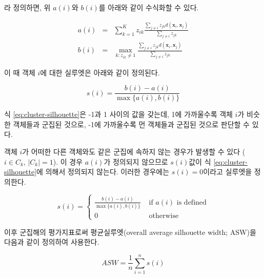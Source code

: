 \documentclass[
]{book}
\begin{document}
라 정의하면, 위 \(a(i)\)와 \(b(i)\)를 아래와 같이 수식화할 수 있다.

\begin{eqnarray*}
a(i) &=& \sum_{k = 1}^{K} z_{ik} \frac{\sum_{j \neq i} z_{jk} d(\mathbf{x}_i, \mathbf{x}_j)}{\sum_{j \neq i} z_{jk}}\\
b(i) &=& \max_{k: z_{ik} \neq 1} \frac{\sum_{j \neq i} z_{jk} d(\mathbf{x}_i, \mathbf{x}_j)}{\sum_{j \neq i} z_{jk}}
\end{eqnarray*}

이 때 객체 \(i\)에 대한 실루엣은 아래와 같이 정의된다.

\begin{equation}
s(i) = \frac{b(i) - a(i)}{\max \{ a(i), b(i) \}} \label{eq:cluster-silhouette}
\end{equation}

식 \eqref{eq:cluster-silhouette}은 -1과 1 사이의 값을 갖는데, 1에 가까울수록 객체 \(i\)가 비슷한 객체들과 군집된 것으로, -1에 가까울수록 먼 객체들과 군집된 것으로 판단할 수 있다.

객체 \(i\)가 어떠한 다른 객체와도 같은 군집에 속하지 않는 경우가 발생할 수 있다 (\(i \in C_k, \, \left| C_k \right| = 1\)). 이 경우 \(a(i)\)가 정의되지 않으므로 \(s(i)\)값이 식 \eqref{eq:cluster-silhouette}에 의해서 정의되지 않는다. 이러한 경우에는 \(s(i) = 0\)이라고 실루엣을 정의한다.

\begin{equation}
s(i) = \begin{cases}
\frac{b(i) - a(i)}{\max \{ a(i), b(i) \}} & \text{ if $a(i)$ is defined}\\
0 & \text{ otherwise }
\end{cases}
\label{eq:cluster-silhouette-single}
\end{equation}

이후 군집해의 평가지표로써 평균실루엣(overall average silhouette width; ASW)을 다음과 같이 정의하여 사용한다.

\begin{equation}
ASW = \frac{1}{n} \sum_{i = 1}^{n} s(i) \label{eq:cluster-average-silhouette}
\end{equation}
\end{document}
